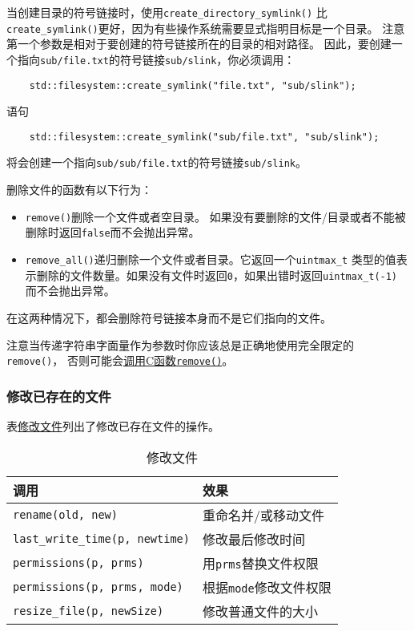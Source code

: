 当创建目录的符号链接时，使用\texttt{create\_directory\_symlink()}
比\texttt{create\_symlink()}更好，因为有些操作系统需要显式指明目标是一个目录。
注意第一个参数是相对于要创建的符号链接所在的目录的相对路径。
因此，要创建一个指向\texttt{sub/file.txt}的符号链接\texttt{sub/slink}，你必须调用：
\begin{lstlisting}
    std::filesystem::create_symlink("file.txt", "sub/slink");
\end{lstlisting}
语句
\begin{lstlisting}
    std::filesystem::create_symlink("sub/file.txt", "sub/slink");
\end{lstlisting}
将会创建一个指向\texttt{sub/sub/file.txt}的符号链接\texttt{sub/slink}。

删除文件的函数有以下行为：
\begin{itemize}
    \item \texttt{remove()}删除一个文件或者空目录。
    如果没有要删除的文件/目录或者不能被删除时返回\texttt{false}而不会抛出异常。
    \item \texttt{remove\_all()}递归删除一个文件或者目录。它返回一个\texttt{uintmax\_t}
    类型的值表示删除的文件数量。如果没有文件时返回\texttt{0}，如果出错时返回\texttt{uintmax\_t(-1)}
    而不会抛出异常。
\end{itemize}
在这两种情况下，都会删除符号链接本身而不是它们指向的文件。

注意当传递字符串字面量作为参数时你应该总是正确地使用完全限定的\texttt{remove()}，
否则可能会\hyperref[ADL导致意外行为]{调用C函数\texttt{remove()}}。

\subsubsection{修改已存在的文件}\label{ch20.4.4.2}
表\hyperref[t20.17]{修改文件}列出了修改已存在文件的操作。
\begin{table}[htb]
    \centering
    \begin{tabular}{l|l}
        \hline
        \textbf{调用}                            & \textbf{效果}           \\
        \hline
        \texttt{rename(old, new)}              & 重命名并/或移动文件            \\
        \texttt{last\_write\_time(p, newtime)} & 修改最后修改时间              \\
        \texttt{permissions(p, prms)}          & 用\texttt{prms}替换文件权限  \\
        \texttt{permissions(p, prms, mode)}    & 根据\texttt{mode}修改文件权限 \\
        \texttt{resize\_file(p, newSize)}      & 修改普通文件的大小             \\
        \hline
    \end{tabular}
    \caption{修改文件}
    \label{t20.17}
\end{table}


